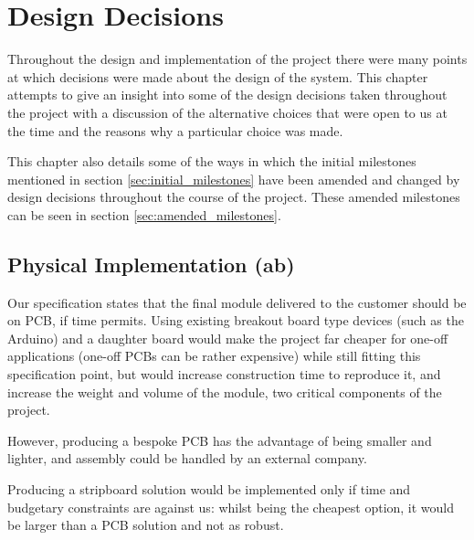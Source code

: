 \chapter{Design Decisions}
Throughout the design and implementation of the project there were many points
at which decisions were made about the design of the system. This chapter attempts
to give an insight into some of the design decisions taken throughout the project with
a discussion of the alternative choices that were open to us at the time and the reasons
why a particular choice was made.

This chapter also details some of the ways in which the initial milestones mentioned in section
\ref{sec:initial_milestones} have been amended and changed by design decisions throughout
the course of the project. These amended milestones can be seen in section \ref{sec:amended_milestones}.












\section{Physical Implementation (ab)}

Our specification states that the final module delivered to the customer 
should be on PCB, if time permits. Using existing breakout board type devices 
(such as the Arduino) and a daughter board would make the project far cheaper for 
one-off applications (one-off PCBs can be rather expensive) while still fitting 
this specification point, 
but would increase construction time to reproduce it, and increase the weight 
and volume of the module, two critical components of the project.

However, producing a bespoke PCB has the advantage of being smaller 
and lighter, and assembly could be handled by an external company.

Producing a stripboard solution would be implemented only if time and budgetary constraints are against us: 
whilst being the cheapest option, it would be larger than a PCB solution and not as robust.
	
